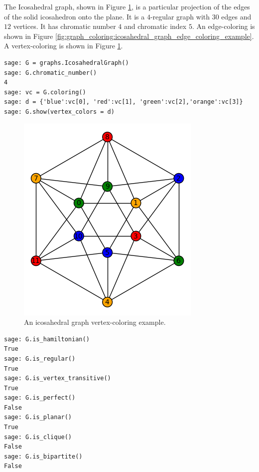 \begin{example}
\label{eg:graph_coloring:icosahedral_graph_vertex_coloring_example}
The Icosahedral graph, shown in Figure
\ref{fig:graph_coloring:icosahedral_graph_vertex_coloring_example},
is a particular projection of the edges of the solid icosahedron
onto the plane. It is a $4$-regular graph with $30$ edges and $12$ vertices.
It has chromatic number $4$ and chromatic index $5$.
An edge-coloring is shown in Figure
\ref{fig:graph_coloring:icosahedral_graph_edge_coloring_example}.
A vertex-coloring is shown in Figure
\ref{fig:graph_coloring:icosahedral_graph_vertex_coloring_example}.
\end{example}

\begin{lstlisting}
sage: G = graphs.IcosahedralGraph()
sage: G.chromatic_number()
4
sage: vc = G.coloring()
sage: d = {'blue':vc[0], 'red':vc[1], 'green':vc[2],'orange':vc[3]}
sage: G.show(vertex_colors = d)
\end{lstlisting}

\begin{figure}[!htbp]
\centering
\includegraphics[scale=0.7]{image/graph-coloring/icosahedral-graph-vertex-coloring-example}
\caption{An icosahedral graph vertex-coloring example.}
\label{fig:graph_coloring:icosahedral_graph_vertex_coloring_example}
\end{figure}

\begin{lstlisting}
sage: G.is_hamiltonian()
True
sage: G.is_regular()
True
sage: G.is_vertex_transitive()
True
sage: G.is_perfect()
False
sage: G.is_planar()
True
sage: G.is_clique()
False
sage: G.is_bipartite()
False
\end{lstlisting}

